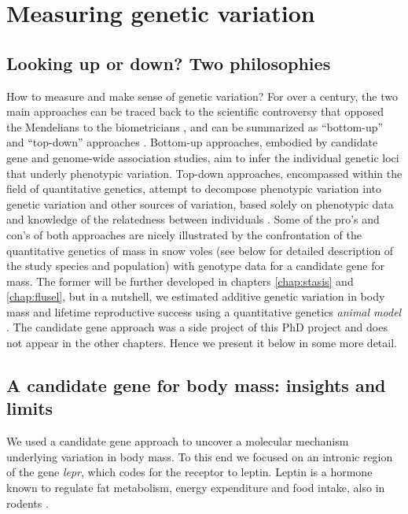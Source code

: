\section{Measuring genetic variation}
\subsection{Looking up or down? Two philosophies}
How to measure and make sense of genetic variation?
For over a century, the two main approaches can be traced back to the scientific controversy that opposed the Mendelians to the biometricians \parencite{Dietrich2006}, and can be summarized as ``bottom-up'' and ``top-down'' approaches \parencite{Liedvogel2012}. 
Bottom-up approaches, embodied by candidate gene and genome-wide association studies, aim to infer the individual genetic loci that underly phenotypic variation.
Top-down approaches, encompassed within the field of quantitative genetics, attempt to decompose phenotypic variation into genetic variation and other sources of variation, based solely on phenotypic data and knowledge of the relatedness between individuals \parencite{Lynch1998}. 
Some of the pro's and con's of both approaches are nicely illustrated by the confrontation of the quantitative genetics of mass in snow voles (see below for detailed description of the study species and population) with genotype data for a candidate gene for mass. The former will be further developed in chapters \ref{chap:stasis} and \ref{chap:flusel}, but in a nutshell, we estimated additive genetic variation in body mass and lifetime reproductive success using a quantitative genetics \emph{animal model} \parencite{Henderson1950, Kruuk2004}. The candidate gene approach was a side project of this PhD project and does not appear in the other chapters. Hence we present it below in some more detail.

\subsection{A candidate gene for body mass: insights and limits}
We used a candidate gene approach \parencite{Fitzpatrick2005} to uncover a molecular mechanism underlying variation in body mass. To this end we focused on an intronic region of the gene \emph{lepr}, which codes for the receptor to leptin. Leptin is a hormone known to regulate fat metabolism, energy expenditure and food intake, also in rodents \parencite{Houseknecht1998}.

